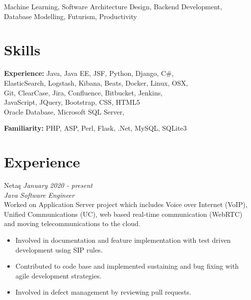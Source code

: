 \documentclass[margin, 10pt]{res} %
\begin{document}
\begin{resume}
Machine Learning, Software Architecture Design, Backend Development, Database Modelling, Futurism, Productivity

 
\section{Skills}  

\textbf{Experience: }Java, Java EE, JSF, Python, Django, C\#,  \\ElasticSearch, Logstash, Kibana, Beats, Docker, Linux, OSX, \\Git, ClearCase, Jira, Confluence, Bitbucket, Jenkins, \\JavaScript, JQuery, Bootstrap, CSS, HTML5 \\Oracle Database, Microsoft SQL Server, 

\textbf{Familiarity: }PHP, ASP, Perl, Flask, .Net, MySQL, SQLite3
 
 
\section{Experience}
Netaş \hfill \textit{January 2020 - present} \\
{\sl Java Software Engineer} \\
Worked on Application Server project which includes Voice over Internet (VoIP), Unified Communications (UC), web based real-time communication (WebRTC) and moving telecommunications to the cloud.

\begin{itemize} \itemsep -2pt %
\item Involved in documentation and feature implementation with test driven\\ development using SIP rules.
\item Contributed to code base and implemented sustaining and bug fixing with agile development strategies.
\item Involved in defect management by reviewing pull requests.
\end{itemize}
 

\end{resume}
\end{document}
